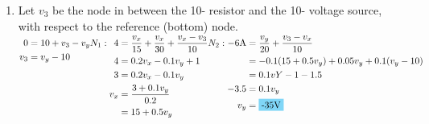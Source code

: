 \begin{enumerate}[leftmargin=2cm,labelsep=.5cm,label=\bfseries\alph*)]
	\item Let $v_3$ be the node in between the 10-\qw{\ohm} resistor and the 10-\qw{\V} voltage source, with respect to the reference (bottom) node. \\[1cm] $
	\begin{aligned}[t]
    0&=10+v_3-v_y \\
	v_3 &= v_y-10
	\end{aligned}
	\\[5mm]
    N_1: \\
    \begin{aligned}[t]
    4 &= \frac{v_x}{15}+\frac{v_x}{30}+\frac{v_x-v_3}{10} \\
    4 &= 0.2v_x-0.1v_y+1 \\
    3 &= 0.2v_x-0.1v_y \\
    v_x &= \frac{3+0.1v_y}{0.2} \\
    &= 15+0.5v_y
	\end{aligned} 
	\\[5mm]
    N_2: \\
    \begin{aligned}[t]
	-6\qw{\A} &= \frac{v_y}{20}+\frac{v_3-v_x}{10} \\
	&= -0.1(15+0.5v_y)+0.05v_y+0.1(v_y-10) \\
	&= 0.1vY-1-1.5 \\
    -3.5&= 0.1v_y \\
    v_y &= \hlbox{-35\qw{\V}}
	\end{aligned} $
	\\[1cm]
    
\end{enumerate}